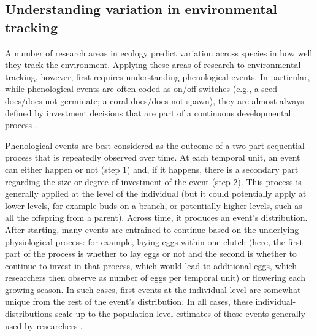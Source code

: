 \documentclass[11pt,letterpaper]{article}
\begin{document}
\subsection{Understanding variation in environmental tracking}
A number of research areas in ecology predict variation across species in how well they track the environment. Applying these areas of research to environmental tracking, however, first requires understanding phenological events. In particular, while phenological events are often coded as on/off switches (e.g., a seed does/does not germinate; a coral does/does not spawn), they are almost always defined by investment decisions that are part of a continuous developmental process \citep{inouye2019}. 

Phenological events are best considered as the outcome of a two-part sequential process that is repeatedly observed over time. At each temporal unit, an event can either happen or not (step 1) and, if it happens, there is a secondary part regarding the size or degree of investment of the event (step 2). This process is generally applied at the level of the individual (but it could potentially apply at lower levels, for example buds on a branch, or potentially higher levels, such as all the offspring from a parent). Across time, it produces an event's distribution. After starting, many events are entrained to continue based on the underlying physiological process: for example, laying eggs within one clutch (here, the first part of the process is whether to lay eggs or not and the second is whether to continue to invest in that process, which would lead to additional eggs, which researchers then observe as number of eggs per temporal unit) or flowering each growing season. In such cases, first events at the individual-level are somewhat unique from the rest of the event's distribution. In all cases, these individual-distributions scale up to the population-level estimates of these events generally used by researchers \citep[see][for discussion of the outcomes of this scaling]{inouye2019}.
\end{document}

